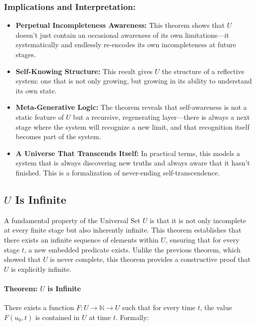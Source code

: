 \documentclass[12pt]{article}
\begin{document}
\subsubsection{Implications and Interpretation:}

\begin{itemize}
    \item \textbf{Perpetual Incompleteness Awareness:} This theorem shows that \( U \) doesn't just contain an occasional awareness of its own limitations—it systematically and endlessly re-encodes its own incompleteness at future stages.

    \item \textbf{Self-Knowing Structure:} This result gives \( U \) the structure of a reflective system: one that is not only growing, but growing in its ability to understand its own state.

    \item \textbf{Meta-Generative Logic:} The theorem reveals that self-awareness is not a static feature of \( U \) but a recursive, regenerating layer—there is always a next stage where the system will recognize a new limit, and that recognition itself becomes part of the system.

    \item \textbf{A Universe That Transcends Itself:} In practical terms, this models a system that is always discovering new truths and always aware that it hasn’t finished. This is a formalization of never-ending self-transcendence.
\end{itemize}


\subsection{\( U \) Is Infinite}

A fundamental property of the Universal Set \( U \) is that it is not only incomplete at every finite stage but also inherently infinite. This theorem establishes that there exists an infinite sequence of elements within \( U \), ensuring that for every stage \( t \), a new embedded predicate exists. Unlike the previous theorem, which showed that \( U \) is never complete, this theorem provides a constructive proof that \( U \) is explicitly infinite.

\paragraph{Theorem: \( U \) is Infinite}
There exists a function \( F: U \to \mathbb{N} \to U \) such that for every time \( t \), the value \( F(u_0, t) \) is contained in \( U \) at time \( t \). Formally:
\end{document}
